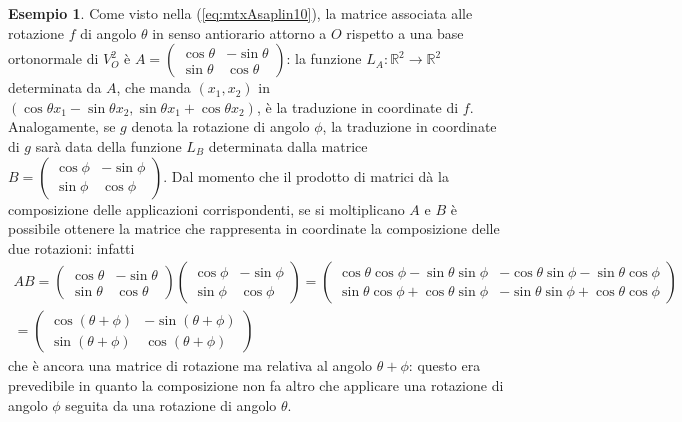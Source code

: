 \documentclass{book}
\theoremstyle{definition}
\newtheorem{es}{Esempio}[section]
\theoremstyle{plain}
\begin{document}
\begin{es}
  \label{es:Compinveeproddimatrici2}
  Come visto nella (\ref{eq:mtxAsaplin10}), la matrice associata alle rotazione $f$ di angolo $\theta$ in
  senso antiorario attorno a $O$ rispetto a una base ortonormale di $V_O^2$ è $A=
  \begin{pmatrix}
    \cos \theta & -\sin\theta\\
    \sin \theta & \cos\theta
  \end{pmatrix}
  $: la funzione $L_A:\mathds{R}^2\to \mathds{R}^2$ determinata da $A$, che manda $(x_1,x_2)$ in
  $(\cos\theta x_1-\sin\theta x_2, \sin\theta x_1+\cos\theta x_2)$, è la traduzione in coordinate di $f$.\\
  Analogamente, se $g$ denota la rotazione di angolo $\phi$, la traduzione in coordinate di $g$ sarà data
  della funzione $L_B$ determinata dalla matrice $B=
  \begin{pmatrix}
    \cos \phi & -\sin\phi\\
    \sin \phi & \cos \phi
  \end{pmatrix}
  $. Dal momento che il prodotto di matrici dà la composizione delle applicazioni corrispondenti, se
  si moltiplicano $A$ e $B$ è possibile ottenere la matrice che rappresenta in coordinate la composizione
  delle due rotazioni: infatti
  \begin{equation*}
    \begin{matrix}
      AB=\begin{pmatrix}
      \cos \theta & -\sin\theta\\
      \sin \theta & \cos\theta
    \end{pmatrix} \begin{pmatrix}
      \cos \phi & -\sin\phi\\
      \sin \phi & \cos \phi
    \end{pmatrix}=\begin{pmatrix}
      \cos \theta \cos \phi -\sin\theta\sin\phi & -\cos\theta\sin\phi-\sin\theta \cos \phi\\
      \sin \theta\cos \phi +\cos\theta\sin\phi & -\sin\theta\sin\phi +\cos\theta \cos \phi
    \end{pmatrix}\\
      =
      \begin{pmatrix}
        \cos(\theta+\phi) & -\sin(\theta+\phi)\\
        \sin(\theta+\phi) & \cos(\theta+\phi)
      \end{pmatrix}
    \end{matrix}
  \end{equation*}
  che è ancora una matrice di rotazione ma relativa al angolo $\theta+\phi$: questo era prevedibile
  in quanto la composizione non fa altro che applicare una rotazione di angolo $\phi$ seguita da una rotazione
  di angolo $\theta$.
\end{es}
\end{document}
